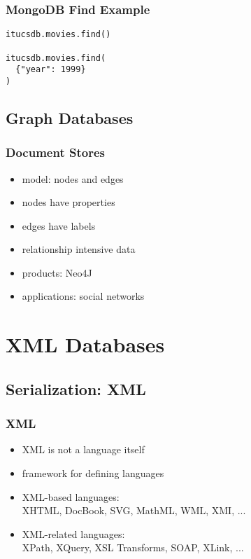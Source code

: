 \documentclass[dvipsnames]{beamer}
\theoremstyle{plain}
\begin{document}
\begin{frame}[fragile]
  \frametitle{MongoDB Find Example}

  \begin{lstlisting}
itucsdb.movies.find()

itucsdb.movies.find(
  {"year": 1999}
)
  \end{lstlisting}
\end{frame}

\subsection{Graph Databases}

\begin{frame}
  \frametitle{Document Stores}

  \begin{itemize}
    \item model: nodes and edges
    \item nodes have properties
    \item edges have labels
    \item relationship intensive data
    \item products: Neo4J
    \item applications: social networks
  \end{itemize}
\end{frame}

\section{XML Databases}

\subsection{Serialization: XML}

\lstset{language=XML}

\begin{frame}
  \frametitle{XML}

  \begin{itemize}
    \item XML is not a language itself
    \item framework for defining languages

    \medskip
    \item XML-based languages:\\
      XHTML, DocBook, SVG, MathML, WML, XMI, ...

    \smallskip
    \item XML-related languages:\\
      XPath, XQuery, XSL Transforms, SOAP, XLink, ...
  \end{itemize}
\end{frame}
\end{document}
